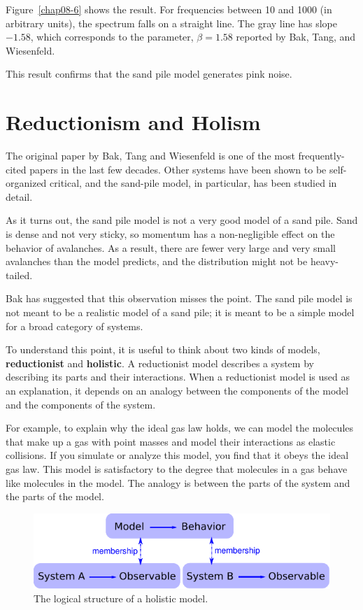 \documentclass[12pt]{book}
\theoremstyle{exercise}
\begin{document}
Figure~\ref{chap08-6} shows the result.  For frequencies between
10 and 1000 (in arbitrary units), the spectrum falls on a straight
line.  The gray line has slope $-1.58$, which
corresponds to the parameter, $\beta=1.58$ reported by Bak,
Tang, and Wiesenfeld.

This result confirms that the sand pile model generates pink noise.


\section{Reductionism and Holism}
\label{model2}
 
The original paper by Bak, Tang and Wiesenfeld is one of
the most frequently-cited papers in the last few decades.
Other systems have been shown to be self-organized critical,
and the sand-pile model, in particular, has been studied
in detail.

As it turns out, the sand pile model is not a very good model of a
sand pile.  Sand is dense and not very sticky, so momentum has a
non-negligible effect on the behavior of avalanches.  As a result,
there are fewer very large and very small avalanches than the model
predicts, and the distribution might not be heavy-tailed.

Bak has suggested that this observation misses the point.
The sand pile model is not meant to be a realistic model of a sand
pile; it is meant to be a simple model for a broad category of
systems.

To understand this point, it is useful to think about two
kinds of models, {\bf reductionist} and {\bf holistic}.  A
reductionist model describes a system by describing its parts
and their interactions.  When a reductionist model is used
as an explanation, it depends on an analogy between the
components of the model and the components of the system.


For example, to explain why the ideal gas law holds, we can model the
molecules that make up a gas with point masses and model their
interactions as elastic collisions.  If you simulate or analyze this
model, you find that it obeys the ideal gas law.  This model is
satisfactory to the degree that molecules in a gas behave like
molecules in the model.  The analogy is between the parts of the
system and the parts of the model.


\begin{figure}
\centerline{\includegraphics[width=5in]{figs/model2.pdf}}
\caption{The logical structure of a holistic model.\label{fig.model2}}
\end{figure}
\end{document}

